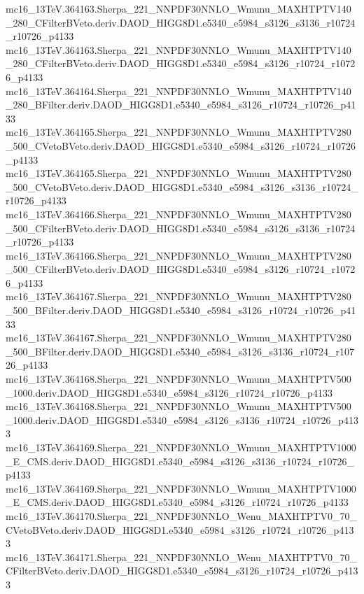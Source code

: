 mc16_13TeV.364163.Sherpa_221_NNPDF30NNLO_Wmunu_MAXHTPTV140_280_CFilterBVeto.deriv.DAOD_HIGG8D1.e5340_e5984_s3126_s3136_r10724_r10726_p4133 \\
mc16_13TeV.364163.Sherpa_221_NNPDF30NNLO_Wmunu_MAXHTPTV140_280_CFilterBVeto.deriv.DAOD_HIGG8D1.e5340_e5984_s3126_r10724_r10726_p4133 \\
mc16_13TeV.364164.Sherpa_221_NNPDF30NNLO_Wmunu_MAXHTPTV140_280_BFilter.deriv.DAOD_HIGG8D1.e5340_e5984_s3126_r10724_r10726_p4133 \\
mc16_13TeV.364165.Sherpa_221_NNPDF30NNLO_Wmunu_MAXHTPTV280_500_CVetoBVeto.deriv.DAOD_HIGG8D1.e5340_e5984_s3126_r10724_r10726_p4133 \\
mc16_13TeV.364165.Sherpa_221_NNPDF30NNLO_Wmunu_MAXHTPTV280_500_CVetoBVeto.deriv.DAOD_HIGG8D1.e5340_e5984_s3126_s3136_r10724_r10726_p4133 \\
mc16_13TeV.364166.Sherpa_221_NNPDF30NNLO_Wmunu_MAXHTPTV280_500_CFilterBVeto.deriv.DAOD_HIGG8D1.e5340_e5984_s3126_s3136_r10724_r10726_p4133 \\
mc16_13TeV.364166.Sherpa_221_NNPDF30NNLO_Wmunu_MAXHTPTV280_500_CFilterBVeto.deriv.DAOD_HIGG8D1.e5340_e5984_s3126_r10724_r10726_p4133 \\
mc16_13TeV.364167.Sherpa_221_NNPDF30NNLO_Wmunu_MAXHTPTV280_500_BFilter.deriv.DAOD_HIGG8D1.e5340_e5984_s3126_r10724_r10726_p4133 \\
mc16_13TeV.364167.Sherpa_221_NNPDF30NNLO_Wmunu_MAXHTPTV280_500_BFilter.deriv.DAOD_HIGG8D1.e5340_e5984_s3126_s3136_r10724_r10726_p4133 \\
mc16_13TeV.364168.Sherpa_221_NNPDF30NNLO_Wmunu_MAXHTPTV500_1000.deriv.DAOD_HIGG8D1.e5340_e5984_s3126_r10724_r10726_p4133 \\
mc16_13TeV.364168.Sherpa_221_NNPDF30NNLO_Wmunu_MAXHTPTV500_1000.deriv.DAOD_HIGG8D1.e5340_e5984_s3126_s3136_r10724_r10726_p4133 \\
mc16_13TeV.364169.Sherpa_221_NNPDF30NNLO_Wmunu_MAXHTPTV1000_E_CMS.deriv.DAOD_HIGG8D1.e5340_e5984_s3126_s3136_r10724_r10726_p4133 \\
mc16_13TeV.364169.Sherpa_221_NNPDF30NNLO_Wmunu_MAXHTPTV1000_E_CMS.deriv.DAOD_HIGG8D1.e5340_e5984_s3126_r10724_r10726_p4133 \\
mc16_13TeV.364170.Sherpa_221_NNPDF30NNLO_Wenu_MAXHTPTV0_70_CVetoBVeto.deriv.DAOD_HIGG8D1.e5340_e5984_s3126_r10724_r10726_p4133 \\
mc16_13TeV.364171.Sherpa_221_NNPDF30NNLO_Wenu_MAXHTPTV0_70_CFilterBVeto.deriv.DAOD_HIGG8D1.e5340_e5984_s3126_r10724_r10726_p4133 \\
